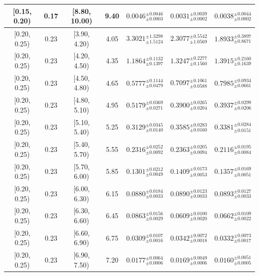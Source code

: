 \begin{longtable}{|c|c|c|c|c|c|c|}
\hline
[0.15, 0.20) & 0.17 & [8.80, 10.00) & 9.40 & $0.0046^{ \pm 0.0046 }_{ \pm 0.0003 }$ & $0.0031^{ \pm 0.0039 }_{ \pm 0.0002 }$ & $0.0038^{ \pm 0.0044 }_{ \pm 0.0002 }$ \\ 
\hline
[0.20, 0.25) & 0.23 & [3.90, 4.20) & 4.05 & $3.3021^{ \pm 1.3298 }_{ \pm 1.5124 }$ & $2.3077^{ \pm 0.5542 }_{ \pm 1.0569 }$ & $1.8933^{ \pm 0.3897 }_{ \pm 0.8671 }$ \\ 
\hline
[0.20, 0.25) & 0.23 & [4.20, 4.50) & 4.35 & $1.1864^{ \pm 0.1132 }_{ \pm 0.1397 }$ & $1.3247^{ \pm 0.2277 }_{ \pm 0.1560 }$ & $1.3915^{ \pm 0.2160 }_{ \pm 0.1639 }$ \\ 
\hline
[0.20, 0.25) & 0.23 & [4.50, 4.80) & 4.65 & $0.5777^{ \pm 0.1144 }_{ \pm 0.0479 }$ & $0.7097^{ \pm 0.1061 }_{ \pm 0.0588 }$ & $0.7985^{ \pm 0.0934 }_{ \pm 0.0661 }$ \\ 
\hline
[0.20, 0.25) & 0.23 & [4.80, 5.10) & 4.95 & $0.5179^{ \pm 0.0369 }_{ \pm 0.0271 }$ & $0.3900^{ \pm 0.0265 }_{ \pm 0.0204 }$ & $0.3937^{ \pm 0.0299 }_{ \pm 0.0206 }$ \\ 
\hline
[0.20, 0.25) & 0.23 & [5.10, 5.40) & 5.25 & $0.3129^{ \pm 0.0345 }_{ \pm 0.0140 }$ & $0.3585^{ \pm 0.0283 }_{ \pm 0.0160 }$ & $0.3381^{ \pm 0.0284 }_{ \pm 0.0151 }$ \\ 
\hline
[0.20, 0.25) & 0.23 & [5.40, 5.70) & 5.55 & $0.2316^{ \pm 0.0252 }_{ \pm 0.0092 }$ & $0.2363^{ \pm 0.0205 }_{ \pm 0.0094 }$ & $0.2116^{ \pm 0.0195 }_{ \pm 0.0084 }$ \\ 
\hline
[0.20, 0.25) & 0.23 & [5.70, 6.00) & 5.85 & $0.1301^{ \pm 0.0212 }_{ \pm 0.0049 }$ & $0.1409^{ \pm 0.0173 }_{ \pm 0.0053 }$ & $0.1357^{ \pm 0.0169 }_{ \pm 0.0051 }$ \\ 
\hline
[0.20, 0.25) & 0.23 & [6.00, 6.30) & 6.15 & $0.0880^{ \pm 0.0184 }_{ \pm 0.0033 }$ & $0.0890^{ \pm 0.0123 }_{ \pm 0.0033 }$ & $0.0893^{ \pm 0.0127 }_{ \pm 0.0033 }$ \\ 
\hline
[0.20, 0.25) & 0.23 & [6.30, 6.60) & 6.45 & $0.0863^{ \pm 0.0156 }_{ \pm 0.0029 }$ & $0.0609^{ \pm 0.0100 }_{ \pm 0.0020 }$ & $0.0662^{ \pm 0.0109 }_{ \pm 0.0022 }$ \\ 
\hline
[0.20, 0.25) & 0.23 & [6.60, 6.90) & 6.75 & $0.0309^{ \pm 0.0107 }_{ \pm 0.0016 }$ & $0.0342^{ \pm 0.0072 }_{ \pm 0.0018 }$ & $0.0332^{ \pm 0.0073 }_{ \pm 0.0017 }$ \\ 
\hline
[0.20, 0.25) & 0.23 & [6.90, 7.50) & 7.20 & $0.0177^{ \pm 0.0064 }_{ \pm 0.0006 }$ & $0.0169^{ \pm 0.0049 }_{ \pm 0.0006 }$ & $0.0160^{ \pm 0.0051 }_{ \pm 0.0005 }$ \\ 
\hline

\end{longtable}
